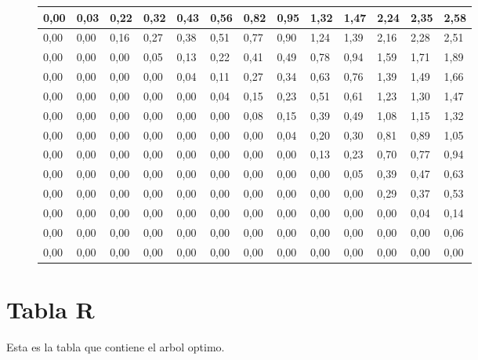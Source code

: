\documentclass{article}
\begin{document}
\centering 
\begin{figure}[H]
\label{my-label2}
\begin{tabular}{|l|l|l|l|l|l|l|l|l|l|l|l|l|}
\hline
0,00& 0,03& 0,22& 0,32& 0,43& 0,56& 0,82& 0,95& 1,32& 1,47& 2,24& 2,35& 2,58\\ \hline
0,00& 0,00& 0,16& 0,27& 0,38& 0,51& 0,77& 0,90& 1,24& 1,39& 2,16& 2,28& 2,51\\ \hline
0,00& 0,00& 0,00& 0,05& 0,13& 0,22& 0,41& 0,49& 0,78& 0,94& 1,59& 1,71& 1,89\\ \hline
0,00& 0,00& 0,00& 0,00& 0,04& 0,11& 0,27& 0,34& 0,63& 0,76& 1,39& 1,49& 1,66\\ \hline
0,00& 0,00& 0,00& 0,00& 0,00& 0,04& 0,15& 0,23& 0,51& 0,61& 1,23& 1,30& 1,47\\ \hline
0,00& 0,00& 0,00& 0,00& 0,00& 0,00& 0,08& 0,15& 0,39& 0,49& 1,08& 1,15& 1,32\\ \hline
0,00& 0,00& 0,00& 0,00& 0,00& 0,00& 0,00& 0,04& 0,20& 0,30& 0,81& 0,89& 1,05\\ \hline
0,00& 0,00& 0,00& 0,00& 0,00& 0,00& 0,00& 0,00& 0,13& 0,23& 0,70& 0,77& 0,94\\ \hline
0,00& 0,00& 0,00& 0,00& 0,00& 0,00& 0,00& 0,00& 0,00& 0,05& 0,39& 0,47& 0,63\\ \hline
0,00& 0,00& 0,00& 0,00& 0,00& 0,00& 0,00& 0,00& 0,00& 0,00& 0,29& 0,37& 0,53\\ \hline
0,00& 0,00& 0,00& 0,00& 0,00& 0,00& 0,00& 0,00& 0,00& 0,00& 0,00& 0,04& 0,14\\ \hline
0,00& 0,00& 0,00& 0,00& 0,00& 0,00& 0,00& 0,00& 0,00& 0,00& 0,00& 0,00& 0,06\\ \hline
0,00& 0,00& 0,00& 0,00& 0,00& 0,00& 0,00& 0,00& 0,00& 0,00& 0,00& 0,00& 0,00\\ \hline
\end{tabular}
\end{figure}
    
\section{Tabla R}
Esta es la tabla que contiene el arbol optimo.
\end{document}

